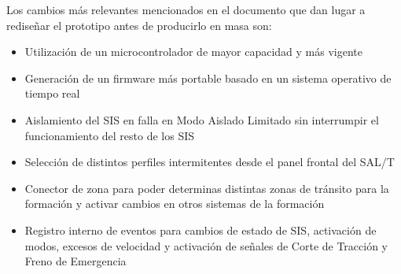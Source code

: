 Los cambios más relevantes mencionados en el documento que dan lugar a rediseñar el prototipo antes de producirlo en masa son: 
\begin{itemize}
    \item Utilización de un microcontrolador de mayor capacidad y más vigente
    \item Generación de un firmware más portable basado en un sistema operativo de tiempo real
    \item Aislamiento del SIS en falla en Modo Aislado Limitado sin interrumpir el funcionamiento del resto de los SIS
    \item Selección de distintos perfiles intermitentes desde el panel frontal del SAL/T
    \item Conector de zona para poder determinas distintas zonas de tránsito para la formación y activar cambios en otros sistemas de la formación
    \item Registro interno de eventos para cambios de estado de SIS, activación de modos, excesos de velocidad y activación de señales de Corte de Tracción y Freno de Emergencia
\end{itemize}

